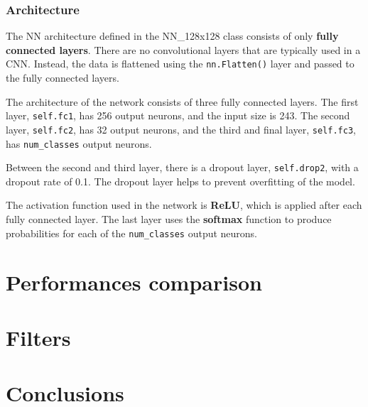 \documentclass{report}
\begin{document}
\subsection{Architecture}
The NN architecture defined in the NN\_128x128 class consists of only \textbf{fully connected layers}. There are no convolutional layers that are typically used in a CNN. Instead, the data is flattened using the \texttt{nn.Flatten()} layer and passed to the fully connected layers.

The architecture of the network consists of three fully connected layers. The first layer, \texttt{self.fc1}, has 256 output neurons, and the input size is 243. The second layer, \texttt{self.fc2}, has 32 output neurons, and the third and final layer, \texttt{self.fc3}, has \texttt{num\_classes} output neurons.

Between the second and third layer, there is a dropout layer, \texttt{self.drop2}, with a dropout rate of 0.1. The dropout layer helps to prevent overfitting of the model.

The activation function used in the network is \textbf{ReLU}, which is applied after each fully connected layer. The last layer uses the \textbf{softmax} function to produce probabilities for each of the \texttt{num\_classes} output neurons. 

\chapter{Performances comparison}
\chapter{Filters}
\chapter{Conclusions}
\end{document}
